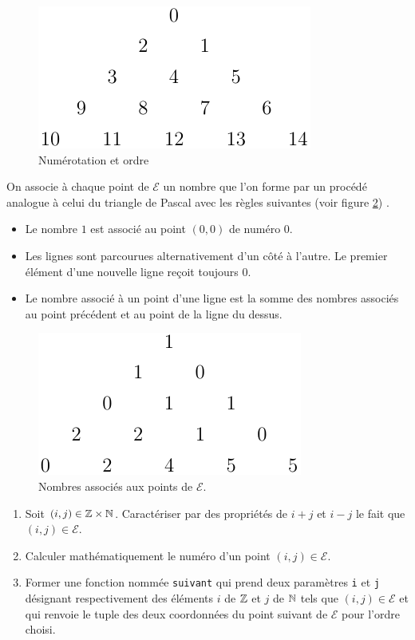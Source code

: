 \begin{enumerate}
\begin{figure}
  \centering
  \includegraphics{./Eboustro_2_fig.pdf}
  \caption{Numérotation et ordre}
  \label{fig:Eboustro_2}
\end{figure}
On associe à chaque point de $\mathcal{E}$ un nombre que l'on forme par un procédé analogue à celui du triangle de Pascal avec les règles suivantes (voir figure \ref{fig:Eboustro_3}) .
\begin{itemize}
  \item Le nombre $1$ est associé au point $(0,0)$ de numéro $0$.
  \item Les lignes sont parcourues alternativement d'un côté à  l'autre. Le premier élément d'une nouvelle ligne reçoit toujours $0$.
  \item Le nombre associé à un point d'une ligne est la somme des nombres associés au point précédent et au point de la ligne du dessus.
\end{itemize}
\begin{figure}
  \centering
  \includegraphics{./Eboustro_3_fig.pdf}
  \caption{Nombres associés aux points de $\mathcal{E}$.}
  \label{fig:Eboustro_3}
\end{figure}
\begin{enumerate}
  \item Soit $(i,j)\in \mathbb{Z} \times \mathbb{N}$. Caractériser par des propriétés de $i+j$ et $i-j$ le fait que $(i,j)\in \mathcal{E}$.
  \item Calculer mathématiquement le numéro d'un point $(i,j)\in \mathcal{E}$.
  \item Former une fonction nommée \verb|suivant| qui prend deux paramètres \verb|i| et \verb|j| désignant respectivement des éléments $i$ de $\mathbb{Z}$ et  $j$ de $\mathbb{N}$ tels que $(i,j)\in \mathcal{E}$ et qui renvoie le tuple des deux coordonnées du point suivant de $\mathcal{E}$ pour l'ordre choisi.

\end{enumerate}
\end{enumerate}

